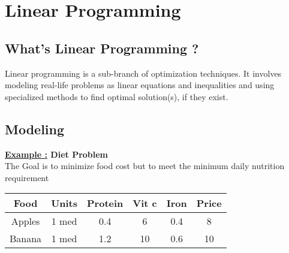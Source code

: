 \section{Linear Programming}
\subsection{What's Linear Programming ?}
\begin{tcolorbox}[title = Definition] 
Linear programming is a sub-branch of optimization techniques. It involves modeling real-life problems as
linear equations and inequalities and using specialized methods to find optimal solution(s), if they exist.
\end{tcolorbox}
\vspace{1cm}
\begin{center}
\end{center}
\vspace{1cm}
\subsection{Modeling}
\textbf{\large{\underline{Example :} Diet Problem}}\\

\vspace{0.25cm}
The Goal is to minimize food cost but to meet the minimum daily nutrition requirement
\vspace{1cm}
\begin{center}
\begin{tabular}{|c|c|c|c|c|c|}
    \hline
    Food & Units & Protein & Vit c & Iron & Price\\
    \hline
    Apples & 1 med & 0.4 & 6 & 0.4 & 8\\
    \hline
    Banana & 1 med & 1.2 & 10 & 0.6 & 10\\
    \hline
\end{tabular}
\end{center}

